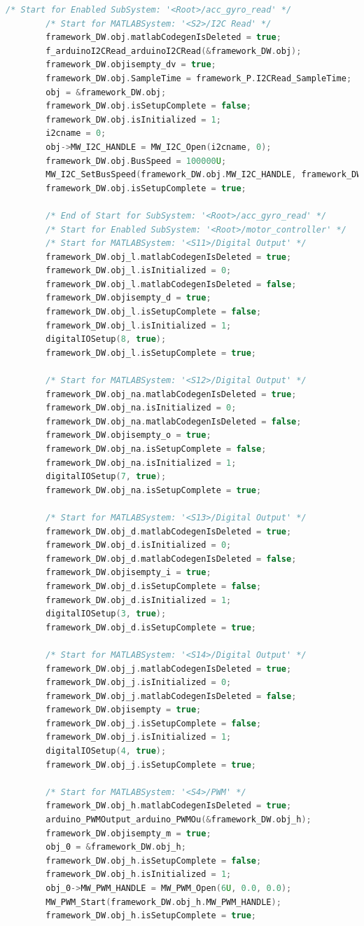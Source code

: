 \begin{lstlisting}[caption={Automatically generated C code}, language=c,firstnumber=698,label={lst:acg3}]
		/* Start for Enabled SubSystem: '<Root>/acc_gyro_read' */
		/* Start for MATLABSystem: '<S2>/I2C Read' */
		framework_DW.obj.matlabCodegenIsDeleted = true;
		f_arduinoI2CRead_arduinoI2CRead(&framework_DW.obj);
		framework_DW.objisempty_dv = true;
		framework_DW.obj.SampleTime = framework_P.I2CRead_SampleTime;
		obj = &framework_DW.obj;
		framework_DW.obj.isSetupComplete = false;
		framework_DW.obj.isInitialized = 1;
		i2cname = 0;
		obj->MW_I2C_HANDLE = MW_I2C_Open(i2cname, 0);
		framework_DW.obj.BusSpeed = 100000U;
		MW_I2C_SetBusSpeed(framework_DW.obj.MW_I2C_HANDLE, framework_DW.obj.BusSpeed);
		framework_DW.obj.isSetupComplete = true;
		
		/* End of Start for SubSystem: '<Root>/acc_gyro_read' */
		/* Start for Enabled SubSystem: '<Root>/motor_controller' */
		/* Start for MATLABSystem: '<S11>/Digital Output' */
		framework_DW.obj_l.matlabCodegenIsDeleted = true;
		framework_DW.obj_l.isInitialized = 0;
		framework_DW.obj_l.matlabCodegenIsDeleted = false;
		framework_DW.objisempty_d = true;
		framework_DW.obj_l.isSetupComplete = false;
		framework_DW.obj_l.isInitialized = 1;
		digitalIOSetup(8, true);
		framework_DW.obj_l.isSetupComplete = true;
		
		/* Start for MATLABSystem: '<S12>/Digital Output' */
		framework_DW.obj_na.matlabCodegenIsDeleted = true;
		framework_DW.obj_na.isInitialized = 0;
		framework_DW.obj_na.matlabCodegenIsDeleted = false;
		framework_DW.objisempty_o = true;
		framework_DW.obj_na.isSetupComplete = false;
		framework_DW.obj_na.isInitialized = 1;
		digitalIOSetup(7, true);
		framework_DW.obj_na.isSetupComplete = true;
		
		/* Start for MATLABSystem: '<S13>/Digital Output' */
		framework_DW.obj_d.matlabCodegenIsDeleted = true;
		framework_DW.obj_d.isInitialized = 0;
		framework_DW.obj_d.matlabCodegenIsDeleted = false;
		framework_DW.objisempty_i = true;
		framework_DW.obj_d.isSetupComplete = false;
		framework_DW.obj_d.isInitialized = 1;
		digitalIOSetup(3, true);
		framework_DW.obj_d.isSetupComplete = true;
		
		/* Start for MATLABSystem: '<S14>/Digital Output' */
		framework_DW.obj_j.matlabCodegenIsDeleted = true;
		framework_DW.obj_j.isInitialized = 0;
		framework_DW.obj_j.matlabCodegenIsDeleted = false;
		framework_DW.objisempty = true;
		framework_DW.obj_j.isSetupComplete = false;
		framework_DW.obj_j.isInitialized = 1;
		digitalIOSetup(4, true);
		framework_DW.obj_j.isSetupComplete = true;
		
		/* Start for MATLABSystem: '<S4>/PWM' */
		framework_DW.obj_h.matlabCodegenIsDeleted = true;
		arduino_PWMOutput_arduino_PWMOu(&framework_DW.obj_h);
		framework_DW.objisempty_m = true;
		obj_0 = &framework_DW.obj_h;
		framework_DW.obj_h.isSetupComplete = false;
		framework_DW.obj_h.isInitialized = 1;
		obj_0->MW_PWM_HANDLE = MW_PWM_Open(6U, 0.0, 0.0);
		MW_PWM_Start(framework_DW.obj_h.MW_PWM_HANDLE);
		framework_DW.obj_h.isSetupComplete = true;
		

\end{lstlisting}

